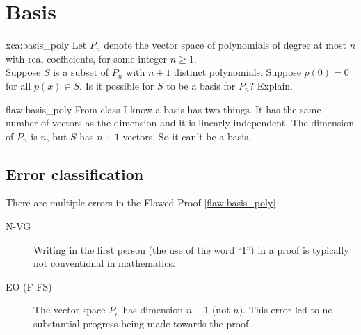 \section{Basis}

\begin{xca}{xca:basis_poly}
Let $P_n$ denote the vector space of polynomials of degree at most $n$ with real coefficients, for some integer $n \geq 1$. \\

Suppose $S$ is a subset of $P_n$ with $n+1$ distinct polynomials. Suppose $p(0) = 0$ for all $p(x) \in S$. Is it possible for $S$ to be a basis for $P_n$? Explain.
\end{xca}

\begin{flaw}{flaw:basis_poly} %
From class I know a basis has two things. It has the same number of vectors as the dimension and it is linearly independent. The dimension of $P_n$ is $n$, but $S$ has $n+1$ vectors. So it can't be a basis.
\end{flaw}

\clearpage
\subsection{Error classification}


There are multiple errors
 in the Flawed Proof \ref{flaw:basis_poly}

 \begin{description}
    \item[N-VG] Writing in the first person (the use of the word ``I'') in a proof is typically not conventional in mathematics.
    \item[EO-(F-FS)] The vector space $P_n$ has dimension $n+1$ (not $n$). This error led to no substantial progress being made towards the proof.

 	
 \end{description}


